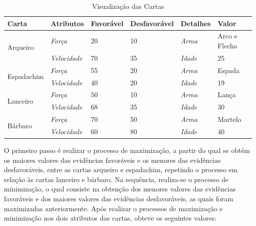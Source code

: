 \begin{table}[htb]
	\centering
	\caption{Visualização das Cartas}
	\label{tab:cartas}
	\begin{tabular}{|l|l|l|l|l|l|}
		\hline
		\textbf{Carta}              & \textbf{Atributos}  & \textbf{Favorável} & \textbf{Desfavorável} & \textbf{Detalhes} & \textbf{Valor} \\ \hline
		\multirow{2}{*}{Arqueiro}   & \textit{Força}      & 20                 & 10                    & \textit{Arma}     & Arco e Flecha  \\ \cline{2-6} 
		& \textit{Velocidade} & 70                 & 35                    & \textit{Idade}    & 25             \\ \hline
		\multirow{2}{*}{Espadachim} & \textit{Força}      & 55                 & 20                    & \textit{Arma}     & Espada         \\ \cline{2-6} 
		& \textit{Velocidade} & 40                 & 20                    & \textit{Idade}    & 19             \\ \hline
		\multirow{2}{*}{Lanceiro}   & \textit{Força}      & 50                 & 10                    & \textit{Arma}     & Lança          \\ \cline{2-6} 
		& \textit{Velocidade} & 68                 & 35                    & \textit{Idade}    & 30             \\ \hline
		\multirow{2}{*}{Bárbaro}    & \textit{Força}      & 70                 & 50                    & \textit{Arma}     & Martelo        \\ \cline{2-6} 
		& \textit{Velocidade} & 60                 & 80                    & \textit{Idade}    & 40             \\ \hline
	\end{tabular}
\end{table}

O primeiro passo é realizar o processo de maximização, a partir do qual se obtém os maiores valores das evidências favoráveis e os menores das evidências
desfavoráveis, entre as cartas arqueiro e espadachim, repetindo o processo em relação às cartas lanceiro e bárbaro. Na sequência, realiza-se o processo de minimização, o qual consiste na obtenção dos menores valores das evidências favoráveis e dos maiores valores das evidências desfavoráveis, as quais foram maximizadas anteriormente.
Após realizar o processos de maximização e minimização nos dois atributos das cartas, obteve os seguintes valores:

